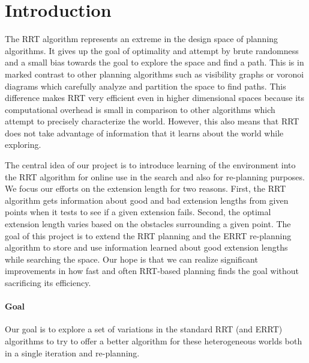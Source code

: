 \documentclass[10pt,twoside,twocolumn]{article}
\begin{document}
\maketitle

\section{Introduction}

The RRT algorithm represents an extreme in the design space of planning algorithms.  It gives up the goal of optimality and attempt by brute randomness and a small bias towards the goal to explore the space and find a path.  This is in marked contrast to other planning algorithms such as visibility graphs  or voronoi diagrams which carefully analyze and partition the space to find paths.  This difference makes RRT very efficient even in higher dimensional spaces because its computational overhead is small in comparison to other algorithms which attempt to precisely characterize the world.  However, this also means that RRT does not take advantage of information that it learns about the world while exploring.

The central idea of our project is to introduce learning of the environment into the RRT algorithm for online use in the search and also for re-planning purposes.  We focus our efforts on the extension length for two reasons.  First, the RRT algorithm gets information about good and bad extension lengths from given points when it tests to see if a given extension fails.  Second, the optimal extension length varies based on the obstacles surrounding a given point.  The goal of this project is to extend the RRT planning and the ERRT re-planning algorithm to store and use information learned about good extension lengths while searching the space.  Our hope is that we can realize significant improvements in how fast and often RRT-based planning finds the goal without sacrificing its efficiency.

\paragraph{Goal}
Our goal is to explore a set of variations in the standard RRT (and ERRT) algorithms to try to offer a better algorithm for these heterogeneous worlds both in a single iteration and re-planning.

\end{document}
